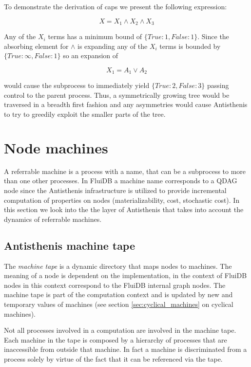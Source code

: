 To demonstrate the derivation of caps we present the following
expression:

\[
X = X_1 \land X_2 \land X_3
\]

Any of the \(X_i\) terms has a minimum bound of
\(\{True: 1, False: 1 \}\). Since the absorbing element for \(\land\)
is  expanding any of the \(X_i\) terms is bounded by
\(\{True: \infty, False: 1 \}\) so an expansion of

\[
X_1 = A_1 \lor A_2
\]

would cause the subprocess to immediately yield
\(\{True: 2, False: 3 \}\) passing control to the parent
process. Thus, a symmetrically growing tree would be traversed in a
breadth first fashion and any asymmetries would cause Antisthenis to
try to greedily exploit the smaller parts of the tree.

\section{Node machines}
\label{sec:antisthenis_machines}

A referrable machine is a process with a name, that can be a subprocess to
more than one other processes. In FluiDB a machine name corresponds
to a QDAG node since the Antisthenis infrastructure is utilized to
provide incremental computation of properties on nodes
(materializability, cost, stochastic cost). In this section we
look into the the layer of Antisthenis that takes into account the
dynamics of referrable machines.

\subsection{Antisthenis machine tape}

The \emph{machine tape} is a dynamic directory that maps nodes to
machines. The meaning of a node is dependent on the implementation, in
the context of FluiDB nodes in this context correspond to the FluiDB
internal graph nodes.  The machine tape is part of the computation
context and is updated by new and temporary values of machines (see
section \ref{sec:cyclical_machines} on cyclical machines).

Not all processes involved in a computation are involved in the
machine tape. Each machine in the tape is composed by a hierarchy of
processes that are inaccessible from outside that machine. In fact a
machine is discriminated from a process solely by virtue of the fact
that it can be referenced via the tape.

